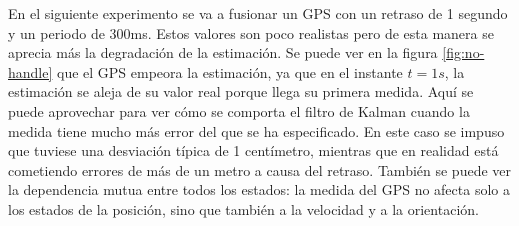 En el siguiente experimento se va a fusionar un GPS con un retraso de 1 segundo y un periodo de 300ms. Estos valores son poco realistas pero de esta manera se aprecia más la degradación de la estimación. Se puede ver en la figura \ref{fig:no-handle} que el GPS empeora la estimación, ya que en el instante $t=1s$, la estimación se aleja de su valor real porque llega su primera medida. Aquí se puede aprovechar para ver cómo se comporta el filtro de Kalman cuando la medida tiene mucho más error del que se ha especificado. En este caso se impuso que tuviese una desviación típica de 1 centímetro, mientras que en realidad está cometiendo errores de más de un metro a causa del retraso. También se puede ver la dependencia mutua entre todos los estados: la medida del GPS no afecta solo a los estados de la posición, sino que también a la velocidad y a la orientación.  

